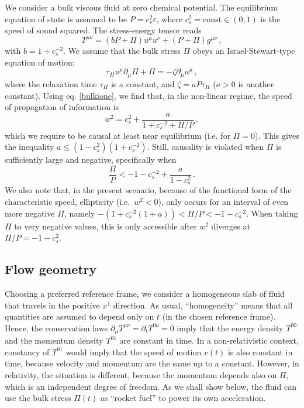 \documentclass[aps, prd, showkeys,superscriptaddress, nofootinbib,floatfix]{revtex4-2}
\begin{document}
We consider a bulk viscous fluid at zero chemical potential. The equilibrium equation of state is assumed to be $P=c_s^2 \varepsilon$, where $c_s^2=\text{const} \in (0,1)$ is the speed of sound squared. The stress-energy tensor reads
\begin{equation}\label{Tmn}
T^{\mu \nu} = (bP+\Pi)u^\mu u^\nu +(P+\Pi)g^{\mu \nu} \, ,
\end{equation}
with $b=1{+}c_s^{-2}$. We assume that the bulk stress $\Pi$ obeys an Israel-Stewart-type equation of motion:
\begin{equation}\label{IS}
\tau_\Pi u^\mu \partial_\mu \Pi +\Pi=-\zeta \partial_\mu u^\mu \, ,
\end{equation}
where the relaxation time $\tau_\Pi$ is a constant, and $\zeta=aP\tau_\Pi$ ($a>0$ is another constant). Using eq. \eqref{bulkione}, we find that, in the non-linear regime, the speed of propagation of information is
\begin{equation}\label{w2}
w^2 = c_s^2 + \dfrac{a}{1+c_s^{-2}+\Pi/P} \, ,
\end{equation}
which we require to be causal at least near equilibrium (i.e. for $\Pi=0$). This gives the inequality $a\leq (1-c_s^2)(1+c_s^{-2})$. Still, causality is violated when $\Pi$ is sufficiently large and negative, specifically when
\begin{equation}
\dfrac{\Pi}{P} < -1 -c_s^{-2}+ \dfrac{a}{1-c^2_s} \, .
\end{equation}
%
We also note that, in the present scenario, because of the functional form of the characteristic speed, ellipticity (i.e.~$w^{2}<0$), only occurs for an interval of even more negative $\Pi$, namely $-(1+c_{s}^{-2}(1+a)) < \Pi/P < - 1 - c_{s}^{-2}$. When taking $\Pi$ to very negative values, this is only accessible after $w^{2}$ diverges at $\Pi/P = -1-c_{s}^{2}$. 


\subsection{Flow geometry}

Choosing a preferred reference frame, we consider a homogeneous slab of fluid that travels in the positive $x^1$ direction. As usual, ``homogeneity'' means that all quantities are assumed to depend only on $t$ (in the chosen reference frame). Hence, the conservation laws $\partial_\mu T^{\mu \nu}=\partial_t T^{0\nu}=0$ imply that the energy density $T^{00}$ and the momentum density $T^{01}$ are constant in time. In a non-relativistic context, constancy of $T^{01}$ would imply that the speed of motion $v(t)$ is also constant in time, because velocity and momentum are the same up to a constant. However, in relativity, the situation is different, because the momentum depends also on $\Pi$, which is an independent degree of freedom. As we shall show below, the fluid can use the bulk stress $\Pi(t)$ as ``rocket fuel'' to power its own acceleration.
\end{document}
